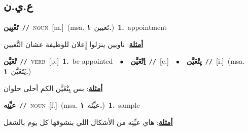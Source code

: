 \documentclass[10pt,a4paper,twoside]{article} %
\begin{document}
\begin{multicols}{2}
\vspace{-3mm}
\subsection*{\color{blue}\foreignlanguage{arabic}{ع.ي.ن}\color{blue}{}} 

{\setlength\topsep{0pt}\textbf{\foreignlanguage{arabic}{تَعْيِين}}\ {\color{gray}\texttt{//}\color{black}}\ \textsc{noun}\ [m.]\ \color{gray}(msa. \foreignlanguage{arabic}{تَعيين}~\foreignlanguage{arabic}{\textbf{١.}})\color{black}\ \textbf{1.}~appointment\  \begin{flushright}\color{gray}\foreignlanguage{arabic}{\textbf{\underline{\foreignlanguage{arabic}{أمثلة}}}: ناويين ينزلوا إِعلان للوظيفة عشان التَّعيين}\end{flushright}\color{black}} \vspace{2mm}

{\setlength\topsep{0pt}\textbf{\foreignlanguage{arabic}{تْعَيَّن}}\ {\color{gray}\texttt{//}\color{black}}\ \textsc{verb}\ [p.]\ \textbf{1.}~be appointed\ \ $\bullet$\ \ \setlength\topsep{0pt}\textbf{\foreignlanguage{arabic}{اِتْعَيَّن}}\ {\color{gray}\texttt{//}\color{black}}\ [c.]\ \ $\bullet$\ \ \setlength\topsep{0pt}\textbf{\foreignlanguage{arabic}{يِتْعَيَّن}}\ {\color{gray}\texttt{//}\color{black}}\ [i.]\ \color{gray}(msa. \foreignlanguage{arabic}{يَتَعَيَّن}~\foreignlanguage{arabic}{\textbf{١.}})\color{black}\  \begin{flushright}\color{gray}\foreignlanguage{arabic}{\textbf{\underline{\foreignlanguage{arabic}{أمثلة}}}: بس يِتْعَيَّن الكم أحلى حلوان}\end{flushright}\color{black}} \vspace{2mm}

{\setlength\topsep{0pt}\textbf{\foreignlanguage{arabic}{عيِّنِه}}\ {\color{gray}\texttt{//}\color{black}}\ \textsc{noun}\ [f.]\ \color{gray}(msa. \foreignlanguage{arabic}{عيِّنَه}~\foreignlanguage{arabic}{\textbf{١.}})\color{black}\ \textbf{1.}~sample\  \begin{flushright}\color{gray}\foreignlanguage{arabic}{\textbf{\underline{\foreignlanguage{arabic}{أمثلة}}}: هاي عيِّنِه من الأشكال اللي بنشوفها كل يوم بالشغل}\end{flushright}\color{black}} \vspace{2mm}


\end{multicols}
\end{document}
